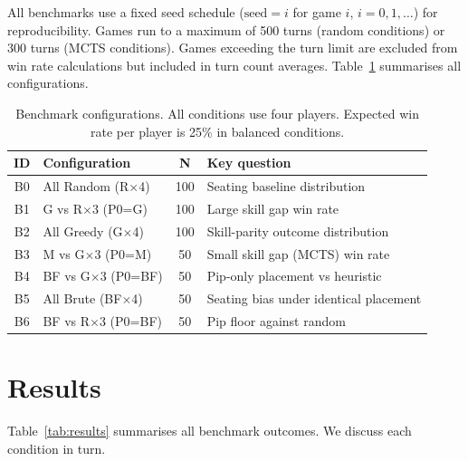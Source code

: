 \documentclass[12pt,a4paper]{article}
\begin{document}
{All benchmarks use a fixed seed schedule ($\text{seed} = i$ for game
$i$, $i = 0, 1, \ldots$) for reproducibility. Games run to a maximum of
500 turns (random conditions) or 300 turns (MCTS conditions). Games
exceeding the turn limit are excluded from win rate calculations but
included in turn count averages. Table~\ref{tab:benchmarks} summarises
all configurations.

\begin{table}[H]
  \centering
  \caption{Benchmark configurations. All conditions use four players.
  Expected win rate per player is 25\% in balanced conditions.}
  \label{tab:benchmarks}
  \begin{tabular}{clcl}
    \toprule
    \textbf{ID} & \textbf{Configuration} & \textbf{N} &
    \textbf{Key question} \\
    \midrule
    B0 & All Random (R$\times$4)      & 100 & Seating baseline distribution \\
    B1 & G vs R$\times$3 (P0=G)       & 100 & Large skill gap win rate \\
    B2 & All Greedy (G$\times$4)      & 100 & Skill-parity outcome distribution \\
    B3 & M vs G$\times$3 (P0=M)       & 50  & Small skill gap (MCTS) win rate \\
    B4 & BF vs G$\times$3 (P0=BF)     & 50  & Pip-only placement vs heuristic \\
    B5 & All Brute (BF$\times$4)      & 50  & Seating bias under identical placement \\
    B6 & BF vs R$\times$3 (P0=BF)     & 50  & Pip floor against random \\
    \bottomrule
  \end{tabular}
\end{table}

\section{Results}

Table~\ref{tab:results} summarises all benchmark outcomes. We discuss
each condition in turn.

}
\end{document}
